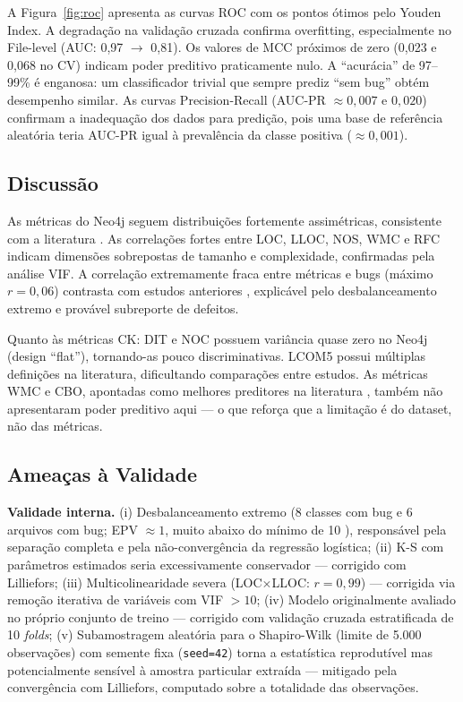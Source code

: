 \documentclass[12pt]{article}
\begin{document}
A Figura~\ref{fig:roc} apresenta as curvas ROC com os pontos ótimos pelo Youden Index. A degradação na validação cruzada confirma overfitting, especialmente no File-level (AUC: 0,97 $\to$ 0,81). Os valores de MCC próximos de zero (0,023 e 0,068 no CV) indicam poder preditivo praticamente nulo. A ``acurácia'' de 97--99\% é enganosa: um classificador trivial que sempre prediz ``sem bug'' obtém desempenho similar. As curvas Precision-Recall (AUC-PR $\approx 0{,}007$ e $0{,}020$) confirmam a inadequação dos dados para predição, pois uma base de referência aleatória teria AUC-PR igual à prevalência da classe positiva ($\approx 0{,}001$).

\subsection{Discussão}

As métricas do Neo4j seguem distribuições fortemente assimétricas, consistente com a literatura \cite{radjenovic2013, gyimothy2005}. As correlações fortes entre LOC, LLOC, NOS, WMC e RFC indicam dimensões sobrepostas de tamanho e complexidade, confirmadas pela análise VIF. A correlação extremamente fraca entre métricas e bugs (máximo $r = 0{,}06$) contrasta com estudos anteriores \cite{basili1996, gyimothy2005}, explicável pelo desbalanceamento extremo e provável subreporte de defeitos.

Quanto às métricas CK: DIT e NOC possuem variância quase zero no Neo4j (design ``flat''), tornando-as pouco discriminativas. LCOM5 possui múltiplas definições na literatura, dificultando comparações entre estudos. As métricas WMC e CBO, apontadas como melhores preditores na literatura \cite{radjenovic2013}, também não apresentaram poder preditivo aqui --- o que reforça que a limitação é do dataset, não das métricas.

\subsection{Ameaças à Validade} \label{sec:ameacas}

\textbf{Validade interna.} (i) Desbalanceamento extremo (8 classes com bug e 6 arquivos com bug; EPV $\approx 1$, muito abaixo do mínimo de 10 \cite{hosmer2013}), responsável pela separação completa e pela não-convergência da regressão logística; (ii) K-S com parâmetros estimados seria excessivamente conservador --- corrigido com Lilliefors; (iii) Multicolinearidade severa (LOC$\times$LLOC: $r = 0{,}99$) --- corrigida via remoção iterativa de variáveis com VIF $> 10$; (iv) Modelo originalmente avaliado no próprio conjunto de treino --- corrigido com validação cruzada estratificada de 10 \textit{folds}; (v) Subamostragem aleatória para o Shapiro-Wilk (limite de 5.000 observações) com semente fixa (\texttt{seed=42}) torna a estatística reprodutível mas potencialmente sensível à amostra particular extraída --- mitigado pela convergência com Lilliefors, computado sobre a totalidade das observações.
\end{document}
